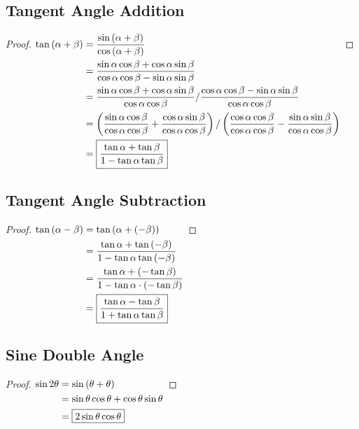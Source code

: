 \documentclass{article}
\begin{document}
\subsection{Tangent Angle Addition}
\label{proof:tanadd}
\begin{proof}
	$\begin{aligned}[t]
		\tan\left(\alpha+\beta\right)
		&=\frac{\sin\left(\alpha+\beta\right)}
			 {\cos\left(\alpha+\beta\right)} \\
		&=\frac{\sin\alpha\cos\beta+\cos\alpha\sin\beta}
			 {\cos\alpha\cos\beta-\sin\alpha\sin\beta} \\
		&=\frac{\sin\alpha\cos\beta+\cos\alpha\sin\beta}{\cos\alpha\cos\beta}/
		\frac{\cos\alpha\cos\beta-\sin\alpha\sin\beta}{\cos\alpha\cos\beta} \\
		&=\left(\frac{\sin\alpha\cos\beta}{\cos\alpha\cos\beta}+
		\frac{\cos\alpha\sin\beta}{\cos\alpha\cos\beta}\right)/
		\left(\frac{\cos\alpha\cos\beta}{\cos\alpha\cos\beta}-
		\frac{\sin\alpha\sin\beta}{\cos\alpha\cos\beta}\right) \\
		&=\boxed{\frac{\tan\alpha+\tan\beta}{1-\tan\alpha\tan\beta}} \\
	\end{aligned} \\$
\end{proof}

\subsection{Tangent Angle Subtraction}
\label{proof:tansub}
\begin{proof}
	$\begin{aligned}[t]
		\tan\left(\alpha-\beta\right)
		&=\tan\left(\alpha+\left(-\beta\right)\right) \\
		&=\frac{\tan\alpha+\tan\left(-\beta\right)}
			 {1-\tan\alpha\tan\left(-\beta\right)} \\
		&=\frac{\tan\alpha+\left(-\tan\beta\right)}
			 {1-\tan\alpha\cdot\left(-\tan\beta\right)} \\
		&=\boxed{\frac{\tan\alpha-\tan\beta}{1+\tan\alpha\tan\beta}} \\
	\end{aligned} \\$
\end{proof}

\subsection{Sine Double Angle}
\label{proof:sindouble}
\begin{proof}
	$\begin{aligned}[t]
		\sin2\theta&=\sin\left(\theta+\theta\right) \\
		&=\sin\theta\cos\theta+\cos\theta\sin\theta \\
		&=\boxed{2\sin\theta\cos\theta} \\
	\end{aligned} \\$
\end{proof}
\end{document}
